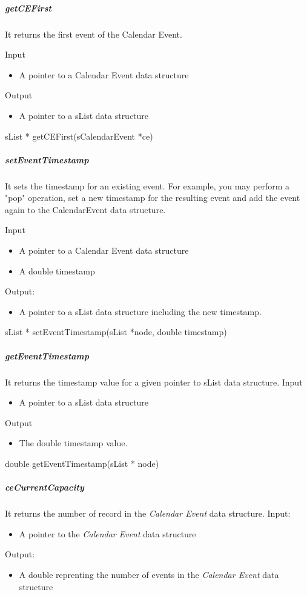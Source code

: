 \subparagraph{getCEFirst}

It returns the first event of the Calendar Event.

Input
\begin{itemize}
\item A pointer to a Calendar Event data structure
\end{itemize}

Output
\begin{itemize}
\item A pointer to a sList data structure
\end{itemize}
sList * getCEFirst(sCalendarEvent *ce)

\subparagraph{setEventTimestamp}

It sets the timestamp for an existing event. For example, you may perform a "pop" operation, set a new timestamp for the resulting event and add the event again to the
CalendarEvent data structure.

Input
\begin{itemize}
\item A pointer to a Calendar Event data structure
\item A double timestamp
\end{itemize}
Output:
\begin{itemize}
\item A pointer to a sList data structure including the new timestamp.
\end{itemize}
sList * setEventTimestamp(sList *node, double timestamp)




\subparagraph{getEventTimestamp}

It returns the timestamp value for a given pointer to sList data structure.
Input
\begin{itemize}
\item A pointer to a sList data structure
\end{itemize}
Output
\begin{itemize}
\item The double timestamp value.
\end{itemize}
double getEventTimestamp(sList * node)

\subparagraph{ceCurrentCapacity}
It returns the number of record in the \textit{Calendar Event} data structure.
Input:
\begin{itemize}
\item A pointer to the \textit{Calendar Event} data structure
\end{itemize}
Output:
\begin{itemize}
\item A double reprenting the number of events in the \textit{Calendar Event} data structure
\end{itemize}

